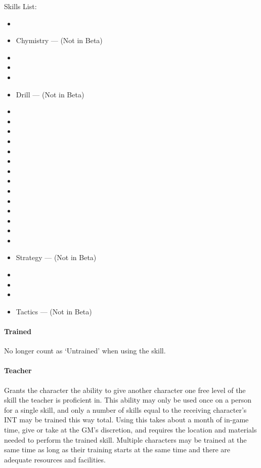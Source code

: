 \documentclass[oneside,11pt,english]{book}
\begin{document}
Skills List:
\begin{itemize}
	[noitemsep]
	\item {}
	\item Chymistry --- (Not in Beta)
	\item {}
	\item {}
	\item {}
	\item Drill --- (Not in Beta)
	\item {}
	\item {}
	\item {}
	\item {}
	\item {}
	\item {}
	\item {}
	\item {}
	\item {}
	\item {}
	\item {}
	\item {}
	\item {}
	\item {}
	\item Strategy --- (Not in Beta)
	\item {}
	\item {}
	\item {}
	\item Tactics --- (Not in Beta)
\end{itemize}

\paragraph{\label{par:Trained}Trained} No longer count as ‘Untrained’ when using the skill.

\vspace{-10pt}\paragraph{\label{par:Teacher}Teacher} Grants the character the ability to give another character one free level of the skill the teacher is proficient in. This ability may only be used once on a person for a single skill, and only a number of skills equal to the receiving character’s INT may be trained this way total. Using this takes about a month of in-game time, give or take at the GM’s discretion, and requires the location and materials needed to perform the trained skill. Multiple characters may be trained at the same time as long as their training starts at the same time and there are adequate resources and facilities.
\end{document}
